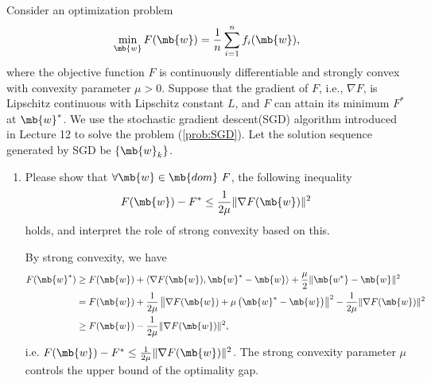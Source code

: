 \begin{exercise}
    Consider an optimization problem
    \begin{equation}\label{prob:SGD}
        \min_{\mb{w}} F(\mb{w})=\frac{1}{n}\sum_{i=1}^n f_i(\mb{w}),
    \end{equation}
    where the objective function $F$ is  continuously differentiable and strongly convex with convexity parameter $\mu>0$. Suppose that the gradient of $F$, i.e., $\nabla F$, is Lipschitz continuous with Lipschitz constant $L$, and $F$ can attain its minimum $F^*$ at $\mb{w}^*$. We use the stochastic gradient descent(SGD) algorithm introduced in Lecture 12 to solve the problem (\ref{prob:SGD}). Let the solution sequence generated by SGD be $\{\mb{w}_k\}$.
    \begin{enumerate}
        \item Please show that $\forall\mb{w}\in\mb{dom }\ F$, the following inequality
            \begin{align}
                F(\mb{w})-F^*\leq \frac{1}{2\mu}\|\nabla F(\mb{w})\|^2
            \end{align}
            holds, and interpret the role of strong convexity based on this.

            \begin{solution}
                By strong convexity, we have
                \begin{align*}
                    F(\mb{w}^*) & \ge F(\mb{w}) + \langle \nabla F(\mb{w}), \mb{w}^* - \mb{w} \rangle + \frac{\mu}{2}\|\mb{w^*} - \mb{w}\|^2                                  \\
                                & = F(\mb{w}) + \frac{1}{2\mu}\left\| \nabla F(\mb{w}) + \mu\left(\mb{w}^* - \mb{w}\right) \right\|^2  - \frac{1}{2\mu}\|\nabla F(\mb{w})\|^2 \\
                                & \ge F(\mb{w}) - \frac{1}{2\mu}\|\nabla F(\mb{w})\|^2,
                \end{align*}
                i.e. $F(\mb{w})-F^*\leq \frac{1}{2\mu}\|\nabla F(\mb{w})\|^2$. The strong convexity parameter $\mu$ controls the upper bound of the optimality gap.
                \qedhere
            \end{solution}


\end{enumerate}
\end{exercise}
